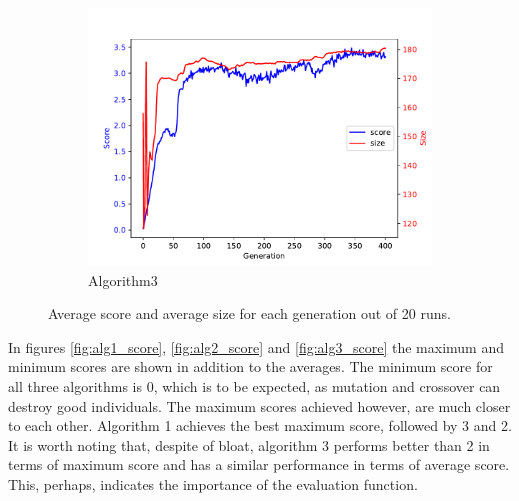\documentclass[12pt,a4paper]{article}
\begin{document}
\begin{figure}[h!]
\begin{subfigure}{.33\textwidth}
			\includegraphics[width=\linewidth]{../code/plots/alg3_score_vs_size}
			\caption{Algorithm3}
			\label{fig:alg3_score_vs_size}
			\end{subfigure}
			
			\caption{Average score and average size for each generation out of 20 runs.}
			\label{fig:score_vs_size}
		\end{figure}
		
		In figures \autoref{fig:alg1_score}, \autoref{fig:alg2_score} and \autoref{fig:alg3_score} the maximum and minimum scores are shown in addition to the averages. The minimum score for all three algorithms is 0, which is to be expected, as mutation and crossover can destroy good individuals. The maximum scores achieved however, are much closer to each other. Algorithm 1 achieves the best maximum score, followed by 3 and 2. It is worth noting that, despite of bloat, algorithm 3 performs better than 2 in terms of maximum score and has a similar performance in terms of average score. This, perhaps, indicates the importance of the evaluation function.
		
\end{document}
